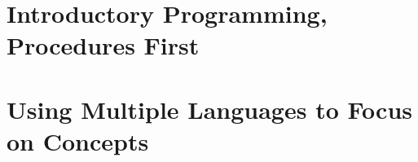 
\section{Introductory Programming, Procedures First} %
\label{sec:introductory_programming_procedures_first}


\section{Using Multiple Languages to Focus on Concepts} %
\label{sec:using_multiple_languages_to_focus_on_concepts}


